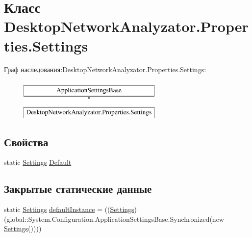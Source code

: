 \hypertarget{class_desktop_network_analyzator_1_1_properties_1_1_settings}{}\section{Класс Desktop\+Network\+Analyzator.\+Properties.\+Settings}
\label{class_desktop_network_analyzator_1_1_properties_1_1_settings}
Граф наследования\+:Desktop\+Network\+Analyzator.\+Properties.\+Settings\+:\begin{figure}[H]
\begin{center}
\leavevmode
\includegraphics[height=2.000000cm]{class_desktop_network_analyzator_1_1_properties_1_1_settings}
\end{center}
\end{figure}
\subsection*{Свойства}
\begin{DoxyCompactItemize}
\item 
static \hyperlink{class_desktop_network_analyzator_1_1_properties_1_1_settings}{Settings} \hyperlink{class_desktop_network_analyzator_1_1_properties_1_1_settings_a6a64ea634c250110524ee569f74fd502}{Default}
\end{DoxyCompactItemize}
\subsection*{Закрытые статические данные}
\begin{DoxyCompactItemize}
\item 
static \hyperlink{class_desktop_network_analyzator_1_1_properties_1_1_settings}{Settings} \hyperlink{class_desktop_network_analyzator_1_1_properties_1_1_settings_a1e07630bdb590e81373cffcf2a89dc0e}{default\+Instance} = ((\hyperlink{class_desktop_network_analyzator_1_1_properties_1_1_settings}{Settings})(global\+::\+System.\+Configuration.\+Application\+Settings\+Base.\+Synchronized(new \hyperlink{class_desktop_network_analyzator_1_1_properties_1_1_settings}{Settings}())))
\end{DoxyCompactItemize}


